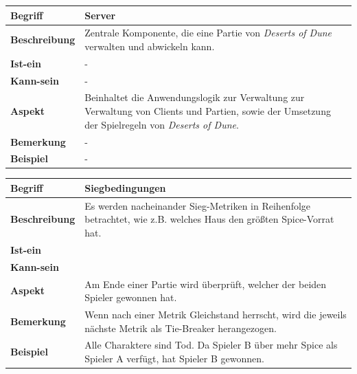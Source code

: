 \documentclass{uulm-assignment}
\begin{document}
\begin{tabularx}{16cm}{|l|X|}
\hline
\textbf{Begriff} & \textbf{Server} \\
\hline
\textbf{Beschreibung} & Zentrale Komponente, die eine Partie von \textit{Deserts of Dune} verwalten und abwickeln kann. \\
\hline
\textbf{Ist-ein} & - \\
\hline
\textbf{Kann-sein} & - \\
\hline
\textbf{Aspekt} & Beinhaltet die Anwendungslogik zur Verwaltung zur Verwaltung von Clients und Partien, sowie der Umsetzung der Spielregeln von \textit{Deserts of Dune}. \\
\hline
\textbf{Bemerkung} & - \\
\hline
\textbf{Beispiel} & - \\
\hline
\end{tabularx}

\begin{tabularx}{16cm}{|l|X|}
\hline
\textbf{Begriff} & \textbf{Siegbedingungen} \\
\hline
\textbf{Beschreibung} & Es werden nacheinander Sieg-Metriken in Reihenfolge betrachtet, wie z.B. welches Haus den größten Spice-Vorrat hat. \\
\hline
\textbf{Ist-ein} & \\
\hline
\textbf{Kann-sein} & \\
\hline
\textbf{Aspekt} & Am Ende einer Partie wird überprüft, welcher der beiden Spieler gewonnen hat. \\
\hline
\textbf{Bemerkung} & Wenn nach einer Metrik Gleichstand herrscht, wird die jeweils nächste Metrik als Tie-Breaker herangezogen. \\
\hline
\textbf{Beispiel} & Alle Charaktere sind Tod. Da Spieler B über mehr Spice als Spieler A verfügt, hat Spieler B gewonnen. \\
\hline
\end{tabularx}
\end{document}
